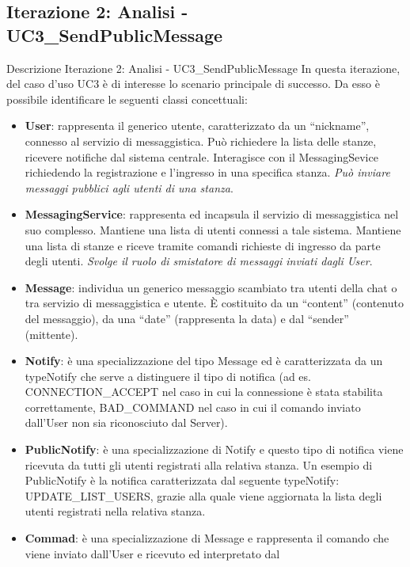 \subsection {Iterazione 2: Analisi - UC3\_SendPublicMessage}
\begin{frame} [allowframebreaks] {Descrizione Iterazione 2: Analisi - UC3\_SendPublicMessage}
  In questa iterazione, del caso d’uso UC3 è di interesse lo scenario principale di successo.  Da esso è possibile identificare le seguenti classi concettuali: 
  \begin{itemize}
   \item \textbf{User}: rappresenta il generico utente, caratterizzato da un ``nickname'', connesso al servizio di messaggistica. Può richiedere la lista delle 
         stanze, ricevere notifiche dal sistema centrale. Interagisce con il MessagingSevice richiedendo la registrazione e l’ingresso in una specifica stanza. 
         \textit{Può inviare messaggi pubblici agli utenti di una stanza}.
   \item \textbf{MessagingService}: rappresenta ed incapsula il servizio di messaggistica nel suo complesso. Mantiene una lista di utenti connessi a tale sistema. 
          Mantiene una lista di stanze e riceve tramite comandi richieste di ingresso da parte degli utenti. \textit{Svolge il ruolo di smistatore di messaggi 
          inviati dagli User}.
   \item \textbf{Message}: individua un generico messaggio scambiato tra utenti della chat o tra servizio di messaggistica e utente. È costituito da un 
         ``content'' (contenuto del messaggio), da una ``date'' (rappresenta la data) e dal ``sender'' (mittente).
   \item \textbf{Notify}: è una specializzazione del tipo Message ed è caratterizzata da un typeNotify che serve a distinguere il tipo di notifica (ad es. 
          CONNECTION\_ACCEPT nel caso in cui la connessione è stata stabilita correttamente, BAD\_COMMAND nel caso in cui il comando inviato dall'User non 
          sia riconosciuto dal Server).
    \item \textbf{PublicNotify}: è una specializzazione di Notify e questo tipo di notifica viene ricevuta da tutti gli utenti registrati alla relativa 
          stanza. Un esempio di PublicNotify è la notifica caratterizzata dal seguente typeNotify: UPDATE\_LIST\_USERS, grazie alla quale viene 
          aggiornata la lista degli utenti registrati nella relativa stanza.
   \item  \textbf{Commad}: è una specializzazione di Message e rappresenta il comando che viene inviato dall'User e ricevuto ed interpretato dal            

\end{itemize}
\end{frame}
